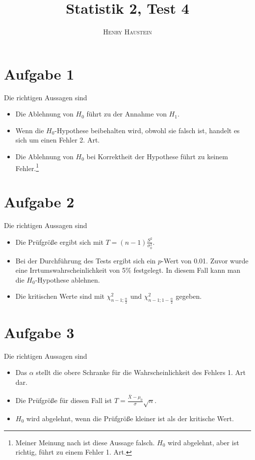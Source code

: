 \documentclass{article}
\title{\textbf{Statistik 2, Test 4}}
\author{\textsc{Henry Haustein}}
\date{}
\begin{document}
	\maketitle
	
	\section*{Aufgabe 1}
	Die richtigen Aussagen sind
	\begin{itemize}
		\item Die Ablehnung von $H_0$ führt zu der Annahme von $H_1$.
		\item Wenn die $H_0$-Hypothese beibehalten wird, obwohl sie falsch ist, handelt es sich um einen Fehler 2. Art.
		\item Die Ablehnung von $H_0$ bei Korrektheit der Hypothese führt zu keinem Fehler.\footnote{Meiner Meinung nach ist diese Aussage falsch. $H_0$ wird abgelehnt, aber ist richtig, führt zu einem Fehler 1. Art.}
	\end{itemize}

	\section*{Aufgabe 2}
	Die richtigen Aussagen sind
	\begin{itemize}
		\item Die Prüfgröße ergibt sich mit $T=(n-1)\frac{S^2}{\sigma_0^2}$.
		\item Bei der Durchführung des Tests ergibt sich ein $p$-Wert von 0.01. Zuvor wurde eine Irrtumswahrscheinlichkeit von 5\% festgelegt. In diesem Fall kann man die $H_0$-Hypothese ablehnen.
		\item Die kritischen Werte sind mit $\chi^2_{n-1;\frac{\alpha}{2}}$ und $\chi^2_{n-1;1-\frac{\alpha}{2}}$ gegeben.
	\end{itemize}

	\section*{Aufgabe 3}
	Die richtigen Aussagen sind
	\begin{itemize}
		\item Das $\alpha$ stellt die obere Schranke für die Wahrscheinlichkeit des Fehlers 1. Art dar.
		\item Die Prüfgröße für diesen Fall ist $T=\frac{\bar{X}-\mu_0}{\sigma}\sqrt{n}$.
		\item $H_0$ wird abgelehnt, wenn die Prüfgröße kleiner ist als der kritische Wert.
	\end{itemize}
\end{document}
